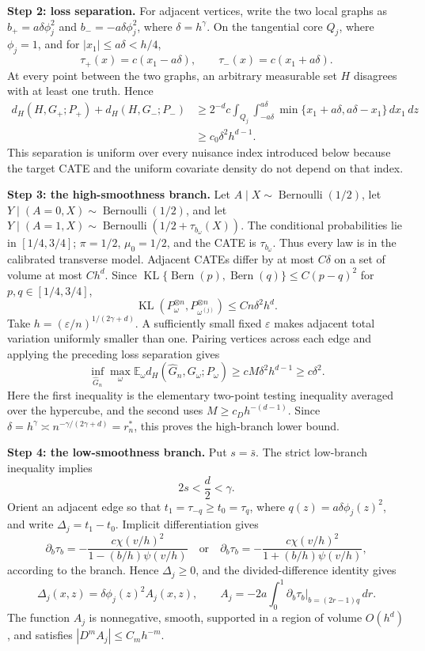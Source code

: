 \textbf{Step 2: loss separation.} For adjacent vertices, write the two local graphs as \(b_+=a\delta\phi_j^2\) and \(b_-=-a\delta\phi_j^2\), where \(\delta=h^\gamma\). On the tangential core \(Q_j\), where \(\phi_j=1\), and for \(|x_1|\le a\delta<h/4\),
\[
\tau_+(x)=c(x_1-a\delta),\qquad \tau_-(x)=c(x_1+a\delta).
\]
At every point between the two graphs, an arbitrary measurable set \(H\) disagrees with at least one truth. Hence
\[
\begin{aligned}
d_H(H,G_+;P_+)+d_H(H,G_-;P_-)
&\ge 2^{-d}c\int_{Q_j}\int_{-a\delta}^{a\delta}
\min\{x_1+a\delta,a\delta-x_1\}\,dx_1\,dz\\
&\ge c_0\delta^2h^{d-1}.
\end{aligned}
\]
This separation is uniform over every nuisance index introduced below because the target CATE and the uniform covariate density do not depend on that index.

\textbf{Step 3: the high-smoothness branch.} Let \(A\mid X\sim\operatorname{Bernoulli}(1/2)\), let \(Y\mid(A=0,X)\sim\operatorname{Bernoulli}(1/2)\), and let \(Y\mid(A=1,X)\sim\operatorname{Bernoulli}(1/2+\tau_{b_\omega}(X))\). The conditional probabilities lie in \([1/4,3/4]\); \(\pi=1/2\), \(\mu_0=1/2\), and the CATE is \(\tau_{b_\omega}\). Thus every law is in the calibrated transverse model. Adjacent CATEs differ by at most \(C\delta\) on a set of volume at most \(Ch^d\). Since \(\operatorname{KL}\{\operatorname{Bern}(p),\operatorname{Bern}(q)\}\le C(p-q)^2\) for \(p,q\in[1/4,3/4]\),
\[
\operatorname{KL}(P_\omega^{\otimes n},P_{\omega^{(j)}}^{\otimes n})\le Cn\delta^2h^d.
\]
Take \(h=(\varepsilon/n)^{1/(2\gamma+d)}\). A sufficiently small fixed \(\varepsilon\) makes adjacent total variation uniformly smaller than one. Pairing vertices across each edge and applying the preceding loss separation gives
\[
\inf_{\widehat G_n}\max_\omega\mathbb E_\omega d_H(\widehat G_n,G_\omega;P_\omega)
\ge cM\delta^2h^{d-1}\ge c\delta^2.
\]
Here the first inequality is the elementary two-point testing inequality averaged over the hypercube, and the second uses \(M\ge c_Dh^{-(d-1)}\). Since \(\delta=h^\gamma\asymp n^{-\gamma/(2\gamma+d)}=r_n^*\), this proves the high-branch lower bound.

\textbf{Step 4: the low-smoothness branch.} Put \(s=\bar s\). The strict low-branch inequality implies
\[
2s<\frac d2<\gamma.
\]
Orient an adjacent edge so that \(t_1=\tau_{-q}\ge t_0=\tau_q\), where \(q(z)=a\delta\phi_j(z)^2\), and write \(\Delta_j=t_1-t_0\). Implicit differentiation gives
\[
\partial_b\tau_b=-\frac{c\chi(v/h)^2}{1-(b/h)\psi(v/h)}
\quad\text{or}\quad
\partial_b\tau_b=-\frac{c\chi(v/h)^2}{1+(b/h)\psi(v/h)},
\]
according to the branch. Hence \(\Delta_j\ge0\), and the divided-difference identity gives
\[
\Delta_j(x,z)=\delta\phi_j(z)^2A_j(x,z),
\qquad
A_j=-2a\int_0^1\left.\partial_b\tau_b\right|_{b=(2r-1)q}\,dr.
\]
The function \(A_j\) is nonnegative, smooth, supported in a region of volume \(O(h^d)\), and satisfies \(|D^mA_j|\le C_mh^{-m}\).

